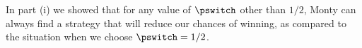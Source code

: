 In part (i) we showed that for any value of $\pswitch$ other than $1/2$, Monty can always find a strategy that will reduce our chances of winning, as compared to the situation when we choose $\pswitch=1/2$.

